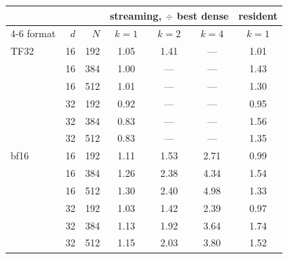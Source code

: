 \begin{tabular}{lrrcccc}
\toprule
& & & \multicolumn{3}{c}{\textbf{streaming}, $\div$ best dense} & \textbf{resident} \\
\cmidrule(lr){4-6}
format & $d$ & $N$ & $k{=}1$ & $k{=}2$ & $k{=}4$ & $k{=}1$ \\
\midrule
TF32 & 16 & 192 & 1.05 & 1.41 & --- & 1.01 \\
 & 16 & 384 & 1.00 & --- & --- & 1.43 \\
 & 16 & 512 & 1.01 & --- & --- & 1.30 \\
 & 32 & 192 & 0.92 & --- & --- & 0.95 \\
 & 32 & 384 & 0.83 & --- & --- & 1.56 \\
 & 32 & 512 & 0.83 & --- & --- & 1.35 \\
\midrule
bf16 & 16 & 192 & 1.11 & 1.53 & 2.71 & 0.99 \\
 & 16 & 384 & 1.26 & 2.38 & 4.34 & 1.54 \\
 & 16 & 512 & 1.30 & 2.40 & 4.98 & 1.33 \\
 & 32 & 192 & 1.03 & 1.42 & 2.39 & 0.97 \\
 & 32 & 384 & 1.13 & 1.92 & 3.64 & 1.74 \\
 & 32 & 512 & 1.15 & 2.03 & 3.80 & 1.52 \\
\bottomrule
\end{tabular}%
